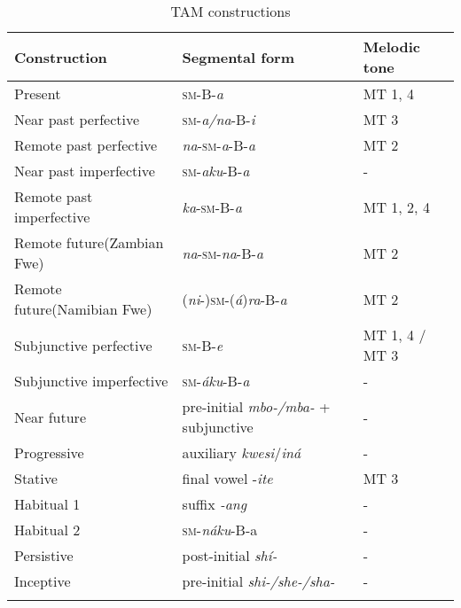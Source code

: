 \begin{table}
\label{bkm:Ref506388187}\caption{\label{tab:8:2}TAM constructions}
\begin{tabularx}{\textwidth}{QQl}
\lsptoprule
Construction & Segmental form & Melodic tone \\
\midrule
Present & \textsc{sm}-B-\textit{a} & MT 1, 4\\
Near past perfective & \textsc{sm}-\textit{a/na}-B-\textit{i} & MT 3\\
Remote past perfective & \textit{na}-\textsc{sm}-\textit{a}-B-\textit{a} & MT 2\\
Near past imperfective & \textsc{sm}-\textit{aku}-B-\textit{a} & -\\
Remote past imperfective & \textit{ka}-\textsc{sm}-B-\textit{a} & MT 1, 2, 4\\
Remote future\newline (Zambian Fwe) & \textit{na}-\textsc{sm}-\textit{na}-B-\textit{a} & MT 2\\
Remote future\newline (Namibian Fwe) & (\textit{ni}-)\textsc{sm}-(\textit{á})\textit{ra}-B-\textit{a} & MT 2\\
Subjunctive perfective & \textsc{sm}-B-\textit{e} & MT 1, 4 / MT 3\\
Subjunctive imperfective & \textsc{sm}-\textit{áku}-B-\textit{a} & -\\
Near future & pre-initial \textit{mbo-/mba-} + subjunctive & -\\
Progressive & auxiliary \textit{kwesi}/\textit{iná} & -\\
Stative & final vowel -\textit{ite} & MT 3\\
Habitual 1 & suffix \textit{-ang} & -\\
Habitual 2 & \textsc{sm}-\textit{náku}-B-a & -\\
Persistive & post-initial \textit{shí-} & -\\
Inceptive & pre-initial \textit{shi-/she-/sha-} & -\\
\lspbottomrule
\end{tabularx}
\end{table}


